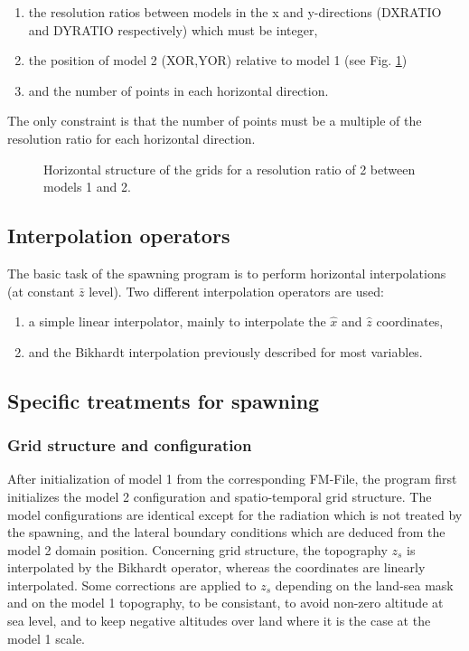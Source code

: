 \begin{enumerate}
\item the resolution ratios between models in the x and y-directions
(DXRATIO and DYRATIO respectively) which must be integer,
\item the position of model 2 (XOR,YOR) relative to model 1
(see Fig. \ref{grid-conf})
\item and the number of points in each horizontal direction.
\end{enumerate}

\noindent The only constraint is that the number of points must be a multiple of the
resolution ratio for each horizontal direction.

\begin{figure}[pbh]
\vspace{1cm}
\caption{Horizontal structure of the grids for a resolution ratio of 2
between models 1 and 2.}
\label{grid-conf}
\end{figure}

\subsection{Interpolation operators}

 The basic task of the spawning program is to perform horizontal interpolations
(at constant $\bar{z}$ level). Two different interpolation operators are used:

\begin{enumerate}
\item a simple linear interpolator, mainly to interpolate the
$\widehat{x}$ and $\widehat{z}$ coordinates,
\item and the Bikhardt interpolation previously described for most variables.
\end{enumerate}

\subsection{Specific treatments for spawning}

\subsubsection{Grid structure and configuration}

 After initialization of model 1 from the corresponding FM-File,
the program first initializes the model 2 configuration and spatio-temporal
grid structure. The model configurations are identical except for the
radiation which is not treated by the spawning, and the lateral boundary
conditions which are deduced from the model 2 domain position.
Concerning grid structure, the topography $z_s$ is interpolated by the Bikhardt
operator, whereas the coordinates are linearly interpolated.
Some corrections are applied to $z_s$ depending on the land-sea mask and on
the model 1 topography, to be consistant, to avoid non-zero altitude at
sea level, and to keep negative altitudes over land where it is the case at
the model 1 scale.

